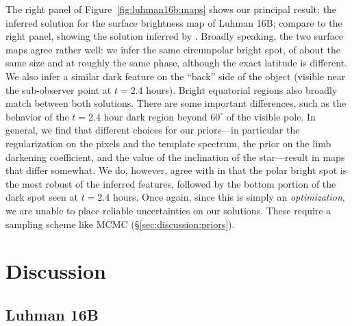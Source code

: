 \documentclass[modern]{aastex631}
\begin{document}
The right panel of Figure~\ref{fig:luhman16b:maps} shows our principal result: the inferred solution for the surface brightness map of Luhman 16B; compare to the right panel, showing the solution inferred by \citet{Crossfield2014}.
Broadly speaking, the two surface maps agree rather well: we infer the same circumpolar bright spot, of about the same size and at roughly the same phase, although the exact latitude is different.
We also infer a similar dark feature on the ``back'' side of the object (visible near the sub-observer point at $t = 2.4$ hours).
Bright equatorial regions also broadly match between both solutions.
There are some important differences, such as the behavior of the $t = 2.4$ hour dark region beyond $60^\circ$ of the visible pole.
In general, we find that different choices for our priors---in particular the regularization on the pixels and the template spectrum, the prior on the limb darkening coefficient, and the value of the inclination of the star---result in maps that differ somewhat.
We do, however, agree with \citet{Crossfield2014} in that the polar bright spot is the most robust of the inferred features, followed by the bottom portion of the dark spot seen at $t = 2.4$ hours.
Once again, since this is simply an \emph{optimization}, we are unable to place reliable uncertainties on our solutions.
These require a sampling scheme like MCMC (\S\ref{sec:discussion:priors}).


\section{Discussion}
\label{sec:discussion}
%

\subsection{Luhman 16B}
\label{sec:discussion:luhman}
\end{document}
